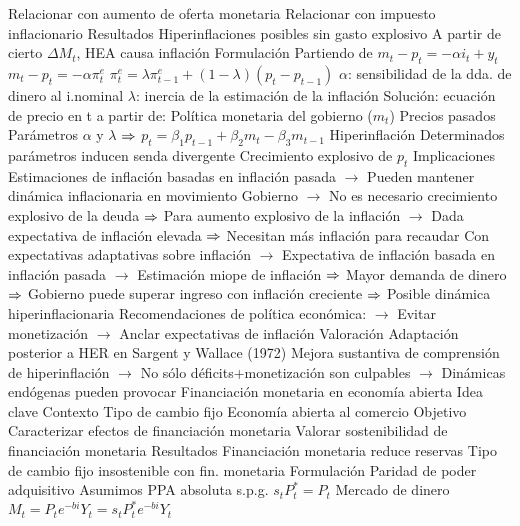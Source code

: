\documentclass{nuevotema}
\begin{document}
\begin{esquemal}
				\4[] Relacionar con aumento de oferta monetaria
				\4[] Relacionar con impuesto inflacionario
				\4 Resultados
				\4[] Hiperinflaciones posibles sin gasto explosivo
				\4[] A partir de cierto $\Delta M_t$, HEA causa inflación
			\3 Formulación
				\4[] Partiendo de $m_t - p_t = -\alpha i_t + y_t$
				\4[(1)] $m_t - p_t = -\alpha \pi^e_t$
				\4[(2)] $\pi_t^e = \lambda \pi_{t-1}^e + (1-\lambda) (p_t - p_{t-1})$
				\4[$\to$] $\alpha$: sensibilidad de la dda. de dinero al i.nominal
				\4[$\to$] $\lambda$: inercia de la estimación de la inflación
				\4 Solución: ecuación de precio en t a partir de:
				\4[(i)] Política monetaria del gobierno ($m_t$)
				\4[(ii)] Precios pasados
				\4[(iii)] Parámetros $\alpha$ y $\lambda$
				\4[] $\Rightarrow$ $p_t = \beta_1 p_{t-1} + \beta_2 m_t - \beta_3 m_{t-1}$
				\4 Hiperinflación
				\4[] Determinados parámetros inducen senda divergente
				\4[] Crecimiento explosivo de $p_t$
			\3 Implicaciones
				\4 Estimaciones de inflación basadas en inflación pasada
				\4[] $\to$ Pueden mantener dinámica inflacionaria en movimiento
				\4 Gobierno
				\4[] $\to$ No es necesario crecimiento explosivo de la deuda
				\4[] $\Rightarrow$ Para aumento explosivo de la inflación
				\4[] $\to$ Dada expectativa de inflación elevada
				\4[] $\Rightarrow$ Necesitan más inflación para recaudar
				\4 Con expectativas adaptativas sobre inflación
				\4[] $\to$ Expectativa de inflación basada en inflación pasada
				\4[] $\to$ Estimación miope de inflación
				\4[] $\Rightarrow$ Mayor demanda de dinero
				\4[] $\Rightarrow$ Gobierno puede superar ingreso con inflación creciente
				\4[] $\Rightarrow$ Posible dinámica hiperinflacionaria
				\4 Recomendaciones de política económica:
				\4[] $\to$ Evitar monetización
				\4[] $\to$ Anclar expectativas de inflación
			\3 Valoración
				\4 Adaptación posterior a HER en Sargent y Wallace (1972)
				\4 Mejora sustantiva de comprensión de hiperinflación
				\4[] $\to$ No sólo déficits+monetización son culpables
				\4[] $\to$ Dinámicas endógenas pueden provocar
		\2 Financiación monetaria en economía abierta
			\3 Idea clave
				\4 Contexto
				\4[] Tipo de cambio fijo
				\4[] Economía abierta al comercio
				\4 Objetivo
				\4[] Caracterizar efectos de financiación monetaria
				\4[] Valorar sostenibilidad de financiación monetaria
				\4 Resultados
				\4[] Financiación monetaria reduce reservas
				\4[] Tipo de cambio fijo insostenible con fin. monetaria
			\3 Formulación
				\4 Paridad de poder adquisitivo
				\4[] Asumimos PPA absoluta s.p.g.
				\4[] $s_t P^*_t = P_t$
				\4 Mercado de dinero
				\4[] $M_t = P_t e^{-bi} Y_t = s_t P^*_t e^{-bi} Y_t$

\end{esquemal}
\end{document}

